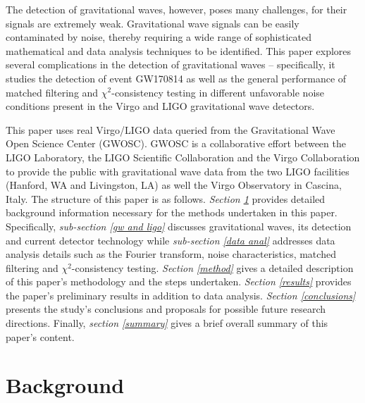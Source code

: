 \documentclass[preprint,
letterpaper,
 amsmath,amssymb,
 aps,
]{revtex4-2}
\begin{document}
The detection of gravitational waves, however, poses many challenges, for their signals are extremely weak. Gravitational wave signals can be easily contaminated by noise, thereby requiring a wide range of sophisticated mathematical and data analysis techniques to be identified. This paper explores several complications in the detection of gravitational waves – specifically, it studies the detection of event GW170814 as well as the general performance of matched filtering and $\chi^2$-consistency testing in different unfavorable noise conditions present in the Virgo and LIGO gravitational wave detectors.

This paper uses real Virgo/LIGO data queried from the Gravitational Wave Open Science Center (GWOSC). GWOSC is a collaborative effort between the LIGO Laboratory, the LIGO Scientific Collaboration and the Virgo Collaboration to provide the public with gravitational wave data from the two LIGO facilities (Hanford, WA and Livingston, LA) as well the Virgo Observatory in Cascina, Italy. The structure of this paper is as follows. \textit{Section \ref{background}} provides detailed background information necessary for the methods undertaken in this paper. Specifically, \textit{sub-section \ref{gw and ligo}} discusses gravitational waves, its detection and current detector technology while \textit{sub-section \ref{data anal}} addresses data analysis details such as  the Fourier transform, noise characteristics, matched filtering and $\chi^2$-consistency testing. \textit{Section \ref{method}} gives a detailed description of this paper's methodology and the steps undertaken. \textit{Section \ref{results}} provides the paper's preliminary results in addition to data analysis. \textit{Section \ref{conclusions}} presents the study's conclusions and proposals for possible future research directions. Finally, \textit{section \ref{summary}} gives a brief overall summary of this paper's content. 

\section{Background} \label{background}
\end{document}
